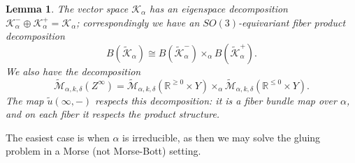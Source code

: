 \documentclass[10pt,a4paper]{amsart}
\newtheorem{lemma}[theorem]{Lemma}
\theoremstyle{definition}
\theoremstyle{remark}
\numberwithin{figure}{qchap}
\begin{document}
\begin{lemma}
The vector space $\mathcal K_\alpha$ has an eigenspace decomposition $\mathcal K^-_\alpha \oplus \mathcal K^+_\alpha = \mathcal K_\alpha$; correspondingly we have an $SO(3)$-equivariant fiber product decomposition $$B(\widetilde{\mathcal K}_\alpha) \cong B(\widetilde{\mathcal K}^-_\alpha) \times_{\alpha} B(\widetilde{\mathcal K}^+_\alpha).$$ We also have the decomposition $$\widetilde{\mathcal M}_{\alpha, k, \delta}(Z^\infty) = \widetilde{\mathcal M}_{\alpha, k, \delta}(\mathbb R^{\geq 0} \times Y) \times_\alpha \widetilde{\mathcal M}_{\alpha, k, \delta}(\mathbb R^{\leq 0} \times Y).$$ The map $\widetilde u(\infty, -)$ respects this decomposition: it is a fiber bundle map over $\alpha$, and on each fiber it respects the product structure.
\end{lemma}

The easiest case is when $\alpha$ is irreducible, as then we may solve the gluing problem in a Morse (not Morse-Bott) setting.
\end{document}
